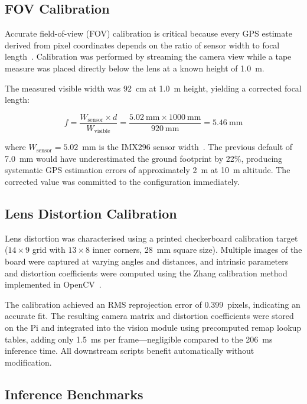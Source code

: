 \subsection{FOV Calibration}\label{sec:fov-results}

Accurate field-of-view (FOV) calibration is critical because every GPS estimate derived from pixel coordinates depends on the ratio of sensor width to focal length~\cite{lens_calibration}. Calibration was performed by streaming the camera view while a tape measure was placed directly below the lens at a known height of 1.0~m.

The measured visible width was 92~cm at 1.0~m height, yielding a corrected focal length:

\begin{equation}
    f = \frac{W_{\text{sensor}} \times d}{W_{\text{visible}}} = \frac{5.02~\text{mm} \times 1000~\text{mm}}{920~\text{mm}} = 5.46~\text{mm}
    \label{eq:focal-length}
\end{equation}

\noindent where $W_{\text{sensor}} = 5.02$~mm is the IMX296 sensor width~\cite{imx296}. The previous default of 7.0~mm would have underestimated the ground footprint by 22\%, producing systematic GPS estimation errors of approximately 2~m at 10~m altitude. The corrected value was committed to the configuration immediately.

\subsection{Lens Distortion Calibration}\label{sec:lens-calibration}

Lens distortion was characterised using a printed checkerboard calibration target ($14 \times 9$ grid with $13 \times 8$ inner corners, 28~mm square size). Multiple images of the board were captured at varying angles and distances, and intrinsic parameters and distortion coefficients were computed using the Zhang calibration method~\cite{lens_calibration} implemented in OpenCV~\cite{opencv}.

The calibration achieved an RMS reprojection error of 0.399~pixels, indicating an accurate fit. The resulting camera matrix and distortion coefficients were stored on the Pi and integrated into the vision module using precomputed remap lookup tables, adding only 1.5~ms per frame---negligible compared to the 206~ms inference time. All downstream scripts benefit automatically without modification.

\subsection{Inference Benchmarks}\label{sec:inference-benchmarks}

